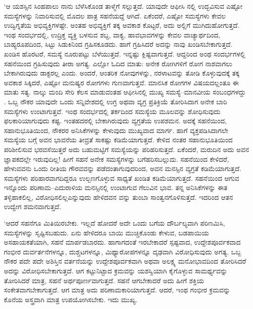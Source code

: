 ‘ಆ ಯಶಸ್ಸಿನ ಸಿಂಹಪಾಲು ನಾನು ಬೆಳೆಸಿಕೊಂಡ ತಾಳ್ಮೆಗೆ ಸಲ್ಲುತ್ತದೆ. ಯಾವುದೇ ಆಫೀಸಿ ನಲ್ಲಿ ಉದ್ಭವಿಸುವ ಎಷ್ಟೋ ಸಮಸ್ಯೆಗಳನ್ನು ನಿವಾರಿಸುವಲ್ಲಿ ಮೊದಲ ಪಾತ್ರ ಸಹನೆಯದ್ದೆ ಆಗಿದೆ. ಏಕೆಂದರೆ, ಎಷ್ಟೋ ಸಮಸ್ಯೆಗಳು ಕೇವಲ ಉದ್ವಿಗ್ನತೆಯ ಅಭಿವ್ಯಕ್ತಿಗಳಷ್ಟೇ. ಅಂತಹ ಅಭಿವ್ಯಕ್ತಿಗೆ ತಕ್ಕ ಅವಕಾಶ ಕೊಟ್ಟರೆ, ಅದು ಅಲ್ಲಿಗೆ ಮುಗಿದುಹೋಗುತ್ತದೆ. ಇಂಥ ಸಂದರ್ಭದಲ್ಲಿ, ಉದ್ರಿಕ್ತ ವ್ಯಕ್ತಿ ಬಳಸುವ ಶಬ್ದ, ವಾಕ್ಯ, ಹಾವಭಾವಗಳನ್ನು ಕೇವಲ ವಾಚ್ಯಾರ್ಥದಿಂದ, ಬಾಹ್ಯರೂಪದಿಂದ, ಸಿಟ್ಟು ಸಿಡುಕಿನಿಂದ ಗ್ರಹಿಸಕೂಡದು. ಹಾಗೆ ಗ್ರಹಿಸಿದರೆ ಅದನ್ನು ನಾವು ಖಂಡಿಸಬೇಕಾಗುತ್ತದೆ. ಖಂಡಿಸ ಹೊರಟರೆ, ಸಮಸ್ಯೆ ನೂರುಪಟ್ಟು ಬೆಳೆಯುತ್ತದೆ. ಇನ್ನಷ್ಟು ಕ್ಲಿಷ್ಟವಾಗುತ್ತದೆ. ಆದ್ದರಿಂದ ಅಂಥ ಸಂದರ್ಭಗಳಲ್ಲಿ ಸಹನೆಯಿಂದ ಗ್ರಹಿಸುವುದು ತೀರಾ ಅಗತ್ಯ. ಎಲ್ಲೋ ಓದಿದ ಮಾತು: ಅನೇಕ ರೋಗಿಗಳಿಗೆ ರೋಗ ನಾಶವಾಗಲು ಬೇಕಾಗಿರುವುದು ಡಾಕ್ಟರಲ್ಲ ಎಂದು. ಅಂದರೆ, ಆಂತರಿಕ ನೋವುಗಳನ್ನು, ನರಳಾಟವನ್ನು ತೋಡಿ ಕೊಳ್ಳುವುದಕ್ಕೆ ತಕ್ಕ ಅವಕಾಶ ಸಿಕ್ಕಿದರೆ, ಎಷ್ಟೋ ಮನುಷ್ಯರ ರೋಗಗಳು ಗುಣವಾಗುತ್ತವೆ. ಮಾನಸಿಕ ರೋಗಗಳ ವಿಷಯದಲ್ಲಂತೂ ಈ ಮಾತು ಸತ್ಯ. ನಾಲ್ಕು ಮಂದಿ ಸೇರಿ ಕೆಲಸ ಮಾಡುವಂತಹ ಆಫೀಸಿನಲ್ಲಿ ಮುಖ್ಯ ಸಮಸ್ಯೆ–ಮಾನವೀಯ ಸಂಬಂಧಗಳದ್ದು . ಒಬ್ಬ ನೌಕರ ಯಾವುದೇ ಒಂದು ಸನ್ನಿವೇಶದಲ್ಲಿ ಉಗ್ರ ಅಥವಾ ವ್ಯಗ್ರ ಪ್ರತಿಕ್ರಿಯೆ ತೋರಿಸಿದಾಗ ಅನೇಕ ಬಾರಿ ಸಮಸ್ಯೆಗಳು ಉಂಟಾಗುತ್ತವೆ. ಇಂಥ ಸಂದರ್ಭದಲ್ಲಿ ತರ್ಕದಿಂದ ಸಮಸ್ಯೆಯ ಮೂಲವನ್ನು ಶೋಧಿಸುವುದು ಫಲಕಾರಿಯಾಗುವುದು ಕಷ್ಟ. ಇಂತಹದರಲ್ಲಿ ಬೇಕಾಗಿರುವುದು ವ್ಯಗ್ರತೆಯ ಉಪಶಮನ. ಅದಕ್ಕೆ ಸಹನೆಯಿಂದ, ಸಹಾನುಭೂತಿಯಿಂದ, ನೌಕರರ ಅನಿಸಿಕೆಗಳನ್ನು ಕೇಳುವುದು ಮುಖ್ಯವಾದ ಮಾರ್ಗ. ಹಾಗೆ ವ್ಯಕ್ತಪಡಿಸಿದಾಗಲೇ ಸಮಸ್ಯೆಯ ಬಗ್ಗೆ ಅವನ ಭಾವನೆಯ ತೀವ್ರತೆ ಸಾಕಷ್ಟು ಕಡಿಮೆಯಾಗುತ್ತದೆ. ಕೇಳಿದ ನಂತರ ಸಹಾನುಭೂತಿಯಿಂದ ಪರಿಶೀಲಿಸುವ ಭರವಸೆಯಿತ್ತರೆ ಅದು ಬಹುಮಟ್ಟಿಗೆ ಸಮಸ್ಯೆಯನ್ನು ಪರಿಹರಿಸುತ್ತದೆ. ಏಕೆಂದರೆ, ಮರುದಿನ ಅದು ಅವನ ಜ್ಞಾಪಕದಲ್ಲೇ ಇರುವು\-ದಿಲ್ಲ! ಹೀಗೆ ಸಹನೆ ಅನೇಕ ಸಮಸ್ಯೆಗಳನ್ನು ಬಗೆಹರಿಸಬಲ್ಲುದು. ಸಹನೆಯಿಂದ ಕೇಳಿದರೆ, ಹೇಳುವವನು ಒಂದು ರೀತಿಯ ಗೌರವವನ್ನು ಪಡೆದಂತಾಗುವುದರಿಂದ, ಅವನ ಮನಸ್ಸಿನ ವ್ಯಗ್ರತೆ ಕಡಿಮೆಯಾಗುತ್ತದೆ. ಸಮಸ್ಯೆಗಳು ಪರಿಹಾರವಾಗದಿದ್ದರೂ ಉಲ್ಬಣಗೊಳ್ಳುವ ಸಾಧ್ಯತೆ ಖಂಡಿತ ಕಡಿಮೆಯಾಗುತ್ತದೆ. ಸಹನೆಯಿಂದ ಆಗುವ ಇನ್ನೊಂದು ಪರಿಣಾಮ–ಎದುರಾಳಿಯ ಮನಸ್ಸಿನಲ್ಲಿ ಉಂಟಾಗುವ ಗೆಲುವಿನ ಭಾವ. ತನ್ನ ಅನಿಸಿಕೆಗಳನ್ನು ಈತ ತಳ್ಳಿಹಾಕಲಿಲ್ಲ, ವಿರೋಧಿಸಲಿಲ್ಲ\break ಎನ್ನುವುದು ಹೇಳಿದವನ ವನ್ನು ತುಂಬಾ ಸಾಂತ್ವನಗೊಳಿಸುತ್ತದೆ. ಇದರಿಂದ ಆತನ ಉದ್ವೇಗ ಶಮನವಾಗುತ್ತದೆ.

‘ಆದರೆ ಸಹನೆಗೂ ಮಿತಿಯಿರಬೇಕು. ಇಲ್ಲದೆ ಹೋದರೆ ಅದೇ ಒಂದು ಬಗೆಯ ದೌರ್ಬಲ್ಯವಾಗಿ ಪರಿಣಮಿಸಿ, ಸಮಸ್ಯೆಗಳನ್ನು ಸೃಷ್ಟಿಸಬಹುದು. ಏನು ಹೇಳಿದರೂ ಬಾಯಿ ಮುಚ್ಚಿಕೊಂಡು ಕೇಳುವ, ಬಡಪಾಯಿಯ ಅಸಹಾಯಕತೆಯಾಗಿ, ಸಹನೆ ಮಾರ್ಪಡಬಾರದು. ಹಾಗಾಗದಂತೆ ಇರಬೇಕಾದರೆ ಸ್ಪಷ್ಟವಾದ, ಉದ್ದೇಶಪೂರ್ವಕವಾದ ಗಂಭೀರ ದುರ್ವರ್ತನೆಗಳನ್ನೂ, ದುಶ್ಚಟಗಳನ್ನೂ, ಮಿಥ್ಯಾರೋಪಗಳನ್ನೂ ದೃಢವಾಗಿ ವಿರೋಧಿಸುವುದು ಅಗತ್ಯ. ಒಬ್ಬ ನೌಕರ ಪದೇ ಪದೇ ಅಶಿಸ್ತಿನ ವರ್ತನೆಯನ್ನು ಉದ್ದೇಶಪೂರ್ವಕವಾಗಿ ಅಥವಾ ಅಲಕ್ಷ್ಯ ಮನೋಭಾವದಿಂದ ತೋರಿಸಿದರೆ ಅದನ್ನು ವಿರೋಧಿಸಬೇಕಾಗುತ್ತದೆ. ಆಗ ಕಟ್ಟುನಿಟ್ಟಾದ ಕ್ರಮವನ್ನು ಯಶಸ್ವಿಯಾಗಿ ಕೈಗೊಳ್ಳುವ ಸಾಮರ್ಥ್ಯವನ್ನು ತೋರಿಸಿದರೆ ಮಾತ್ರ, ಸಹನೆ ಅರ್ಥಪೂರ್ಣವಾಗುತ್ತದೆ. ಸಹನೆ  ಆಗಬೇಕಾದರೆ ಅದು ಹೀಗೆ ಶಕ್ತಿಯ ಸಂಕೇತವಾಗಬೇಕಾಗುತ್ತದೆ. ಆಗ ಮಾತ್ರ ಅದು ಪರಿಣಾಮಕಾರಿಯಾಗುತ್ತದೆ. ಆದರೆ, ಇಂಥ ಗಂಭೀರ ಕ್ರಮವನ್ನು ಕೊನೆಯ ಅಸ್ತ್ರವಾಗಿ ಮಾತ್ರ ಉಪಯೋಗಿಸಬೇಕು. ಇದು ಮುಖ್ಯ.

